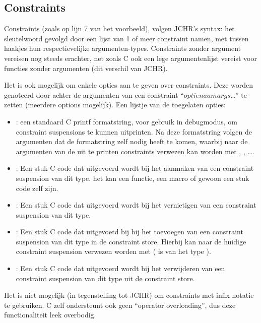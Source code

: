 \subsection{Constraints}

Constraints (zoals op lijn 7 van het voorbeeld), volgen JCHR's syntax: het  sleutelwoord gevolgd door een lijst van 1 of meer constraint namen, met tussen haakjes hun respectievelijke argumenten-types. Constraints zonder argument vereisen nog steeds \code{()} erachter, net zoals C ook een lege argumentenlijst vereist voor functies zonder argumenten (dit verschil van JCHR).

Het is ook mogelijk om enkele opties aan te geven over constraints. Deze worden genoteerd door achter de argumenten van een constraint ``$optienaam$\code{,}$args$\ldots\code{)}'' te zetten (meerdere options mogelijk). Een lijstje van de
toegelaten opties: \begin{itemize}
  \item {}: een standaard C printf formatstring, voor gebruik in debugmodus, om constraint suspensions te kunnen
    uitprinten. Na deze formatstring volgen de argumenten dat de formatstring zelf nodig heeft te komen, waarbij naar de
    argumenten van de uit te printen constraints verwezen kan worden met , , \ldots. 
  \item {}: Een stuk C code dat uitgevoerd wordt bij het aanmaken van een constraint suspension van dit type.
    het kan een functie, een macro of gewoon een stuk code zelf zijn.
  \item {}: Een stuk C code dat uitgevoerd wordt bij het vernietigen van een constraint suspension van dit type. 
  \item {}: Een stuk C code dat uitgevoetd bij bij het toevoegen van een constraint suspension van dit type in de
    constraint store. Hierbij kan naar de huidige constraint suspension verwezen worden met  ( is van het type ).
  \item {}: Een stuk C code dat uitgevoerd wordt bij het verwijderen van een constraint suspension van dit type
    uit de constraint store.
\end{itemize}

Het is niet mogelijk (in tegenstelling tot JCHR) om constraints met infix notatie te gebruiken. C zelf ondersteunt ook geen ``operator overloading'', dus deze functionaliteit leek overbodig.

